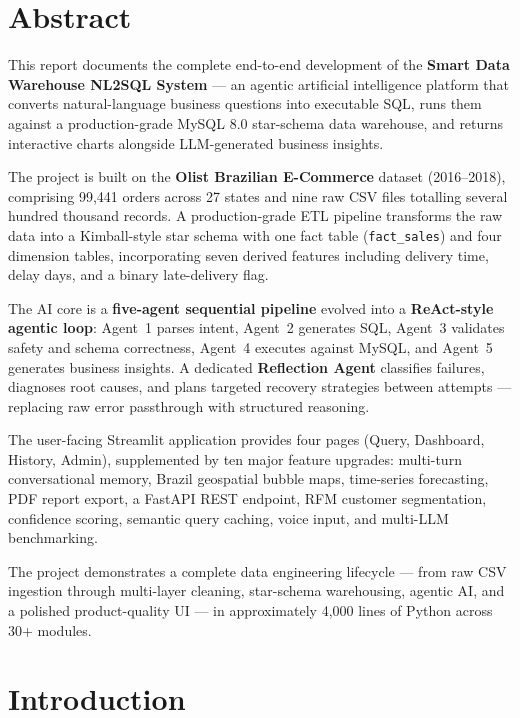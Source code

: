 \documentclass[12pt,a4paper]{report}
\begin{document}
\chapter*{Abstract}

This report documents the complete end-to-end development of the \textbf{Smart Data Warehouse
NL2SQL System} — an agentic artificial intelligence platform that converts natural-language
business questions into executable SQL, runs them against a production-grade MySQL 8.0
star-schema data warehouse, and returns interactive charts alongside LLM-generated business
insights.

The project is built on the \textbf{Olist Brazilian E-Commerce} dataset (2016--2018), comprising
99,441 orders across 27 states and nine raw CSV files totalling several hundred thousand records.
A production-grade ETL pipeline transforms the raw data into a Kimball-style star schema with one
fact table (\texttt{fact\_sales}) and four dimension tables, incorporating seven derived features
including delivery time, delay days, and a binary late-delivery flag.

The AI core is a \textbf{five-agent sequential pipeline} evolved into a \textbf{ReAct-style
agentic loop}: Agent~1 parses intent, Agent~2 generates SQL, Agent~3 validates safety and schema
correctness, Agent~4 executes against MySQL, and Agent~5 generates business insights. A dedicated
\textbf{Reflection Agent} classifies failures, diagnoses root causes, and plans targeted recovery
strategies between attempts — replacing raw error passthrough with structured reasoning.

The user-facing Streamlit application provides four pages (Query, Dashboard, History, Admin),
supplemented by ten major feature upgrades: multi-turn conversational memory, Brazil geospatial
bubble maps, time-series forecasting, PDF report export, a FastAPI REST endpoint, RFM customer
segmentation, confidence scoring, semantic query caching, voice input, and multi-LLM benchmarking.

The project demonstrates a complete data engineering lifecycle — from raw CSV ingestion through
multi-layer cleaning, star-schema warehousing, agentic AI, and a polished product-quality UI —
in approximately 4,000 lines of Python across 30+ modules.

\tableofcontents
\listoftables

\chapter{Introduction}
\end{document}
